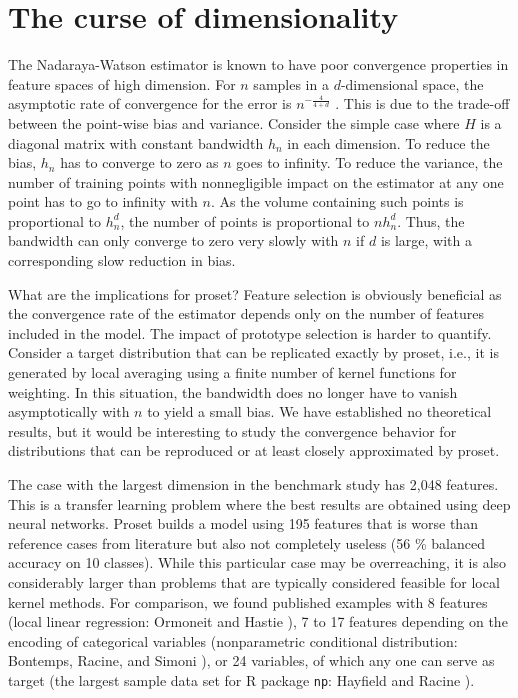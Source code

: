 \section{The curse of dimensionality}
\label{sec_curse}
%
The Nadaraya-Watson estimator is known to have poor convergence properties in feature spaces of high dimension.
For $n$ samples in a $d$-dimensional space, the asymptotic rate of convergence for the error is $n^{-\frac{4}{4+d}}$ \cite{Haerdle_04}.
This is due to the trade-off between the point-wise bias and variance.
Consider the simple case where $H$ is a diagonal matrix with constant bandwidth $h_n$ in each dimension.
To reduce the bias, $h_n$ has to converge to zero as $n$ goes to infinity.
To reduce the variance, the number of training points with nonnegligible impact on the estimator at any one point has to go to infinity with $n$.
As the volume containing such points is proportional to $h_n^d$, the number of points is proportional to $nh_n^d$.
Thus, the bandwidth can only converge to zero very slowly with $n$ if $d$ is large, with a corresponding slow reduction in bias.\par
%
What are the implications for proset?
Feature selection is obviously beneficial as the convergence rate of the estimator depends only on the number of features included in the model.
The impact of prototype selection is harder to quantify.
Consider a target distribution that can be replicated exactly by proset, i.e., it is generated by local averaging using a finite number of kernel functions for weighting.
In this situation, the bandwidth does no longer have to vanish asymptotically with $n$ to yield a small bias.
We have established no theoretical results, but it would be interesting to study the convergence behavior for distributions that can be reproduced or at least closely approximated by proset.\par
%
The case with the largest dimension in the benchmark study has 2,048 features.
This is a transfer learning problem where the best results are obtained using deep neural networks.
Proset builds a model using 195 features that is worse than reference cases from literature but also not completely useless (56 \% balanced accuracy on 10 classes).
While this particular case may be overreaching, it is also considerably larger than problems that are typically considered feasible for local kernel methods.
For comparison, we found published examples with 8 features (local linear regression: Ormoneit and Hastie \cite{Ormoneit_99}),
7 to 17 features depending on the encoding of categorical variables (nonparametric conditional distribution: Bontemps, Racine, and Simoni \cite{Bontemps_09}),
or 24 variables, of which any one can serve as target (the largest sample data set for R package \texttt{np}: Hayfield and Racine \cite{Hayfield_08}).
%
